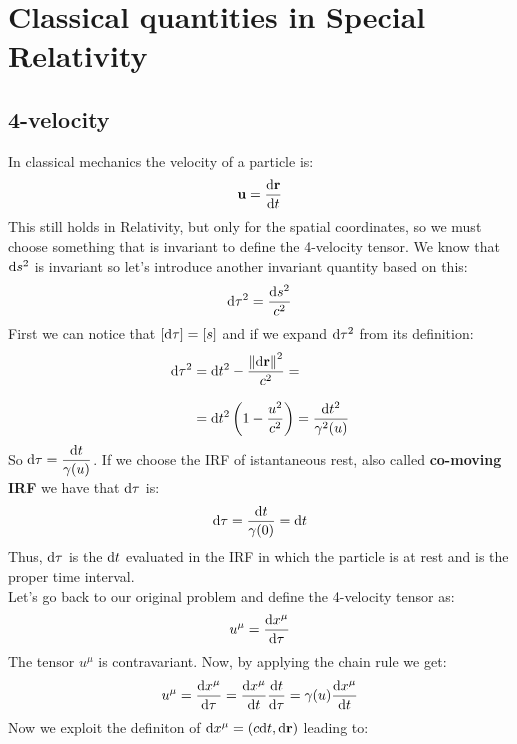 \chapter{Classical quantities in Special Relativity}
\section{4-velocity}
In classical mechanics the velocity of a particle is:
\begin{equation}
  \vec{u} = \dv{\vec{r}}{t}
\end{equation}
This still holds in Relativity, but only for the spatial coordinates, so we must choose something that is invariant to define the 4-velocity tensor.
We know that $\mathrm{d}s^2$ is invariant so let's introduce another invariant quantity based on this:
\begin{equation}
  \mathrm{d}\tau^2 = \dfrac{\mathrm{d}s^2}{c^2}
\end{equation}
First we can notice that $\left[\mathrm{d}\tau\right] = \left[s\right]$ and if we expand $\mathrm{d}\tau^2$ from its definition:
\begin{equation}
  \begin{split}
    \mathrm{d}\tau^2 &= \mathrm{d}t^2 - \dfrac{\norm{\mathrm{d}\vb{r}}^2}{c^2} =\\[8pt]
    &= \mathrm{d}t^2 \left(1 - \dfrac{u^2}{c^2}\right) = \dfrac{\mathrm{d}t^2}{\gamma^2(u)}
  \end{split}
\end{equation}
So $\mathrm{d}\tau = \dfrac{\mathrm{d}t}{\gamma(u)}$. If we choose the IRF of istantaneous rest, also called \textbf{co-moving IRF} we have that $\mathrm{d}\tau$ is:
\begin{equation}
  \mathrm{d}\tau = \dfrac{\mathrm{d}t}{\gamma(0)} = \mathrm{d}t
\end{equation}
Thus, $\mathrm{d}\tau$ is the $\mathrm{d}t$ evaluated in the IRF in which the particle is at rest and is the proper time interval.\\
Let's go back to our original problem and define the 4-velocity tensor as:
\begin{equation}
  u^{\mu} = \dv{x^{\mu}}{\tau}
\end{equation}
The tensor $u^{\mu}$ is contravariant. Now, by applying the chain rule we get:
\begin{equation}
  u^{\mu} = \dv{x^{\mu}}{\tau} = \dv{x^{\mu}}{t} \dv{t}{\tau} =\gamma(u) \dv{x^{\mu}}{t}
\end{equation}
Now we exploit the definiton of $\mathrm{d}x^{\mu} = \left(c\mathrm{d}t, \mathrm{d}\vb{r}\right)$ leading to:
